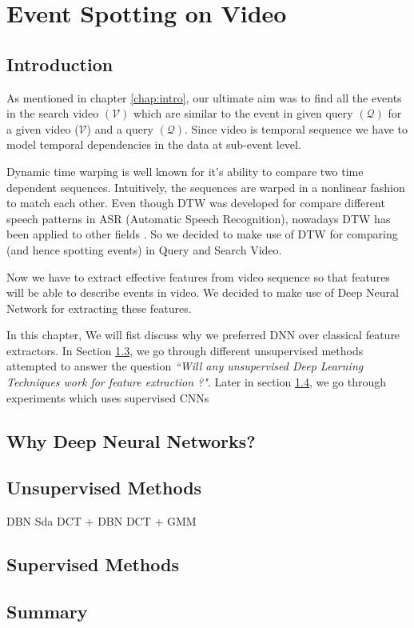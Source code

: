 \chapter{Event Spotting on Video}
\label{chap:event}

\section{Introduction}
As mentioned in chapter \ref{chap:intro}, our ultimate aim was to find all the events in the search video $(\mathcal{V})$ which are similar to the event in given query $(\mathcal{Q})$  for a given video ($\mathcal{V}$) and a query $(\mathcal{Q})$. Since video is temporal sequence we have to model temporal dependencies
in the data at sub-event level. 

Dynamic time warping is well known for it's ability to compare two time dependent sequences. Intuitively, the sequences are warped in a nonlinear fashion to match each other. Even though DTW was developed for compare different speech patterns in ASR (Automatic Speech Recognition), nowadays DTW has been applied to other fields \cite{muller2007information}.  So we decided to make use of DTW for comparing (and hence spotting events) in Query and Search Video.

Now we have to extract effective features from video sequence so that features will be able to describe events  in video. We decided to make use of Deep Neural Network for extracting these features. 

In this chapter, We will fist discuss why we preferred  DNN over classical feature extractors. In Section \ref{sec:event:unsupervised}, we go through different unsupervised methods attempted to answer the question \textit{``Will any unsupervised Deep Learning Techniques work for feature extraction ?"}. Later in section \ref{sec:event:supervised}, we go through experiments which uses supervised CNNs  

\section{Why Deep Neural Networks?}
\label{sec:event:why}


\section{Unsupervised Methods}
\label{sec:event:unsupervised}
DBN
Sda
DCT + DBN 
DCT + GMM
\section{Supervised Methods}
\label{sec:event:supervised}
\section{Summary}
